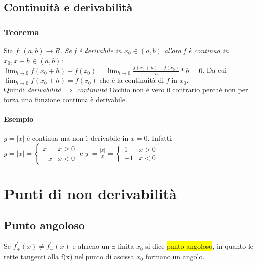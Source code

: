 \subsection{Continuità e derivabilità}
\subsubsection{Teorema}
Sia $f: (a,b) \to R$. \textit{Se f è derivabile in $x_0 \in (a,b)$ allora f è
continua in $x_0,x+h\in (a,b)$: $\lim_{h\to 0} f(x_0+h)-f(x_0)=\lim_{h\to
0}\frac{f(x_0+h)-f(x_0)}{h}*h=0$}.
Da cui $\lim_{h\to 0}f(x_0+h)=f(x_0)$ che è la continuità di $f$ in $x_0$.\\
Quindi \textit{\color{red} derivabilità $\Rightarrow$ continuità} Occhio non è
vero il contrario perché non per forza una funzione continua è derivabile.
\paragraph{Esempio} $y=|x|$ è continua ma non è derivabile in $x=0$.
Infatti,\\ $y=|x|=\begin{cases}
	x&x\geq 0\\
	-x&x<0
\end{cases} \text{ e } y^,=\frac{|x|}{x}=\begin{cases}
	1&x> 0\\
	-1&x<0
\end{cases}$
\section{Punti di non derivabilità}
\subsection{Punto angoloso}
Se $f^\prime_+(x)\neq f^\prime_-(x)$ e almeno un $\exists$ finita $x_0$ si dice
\colorbox{yellow}{punto
angoloso}, in quanto le rette tangenti alla f(x) nel punto di ascissa $x_0$
formano un angolo.
